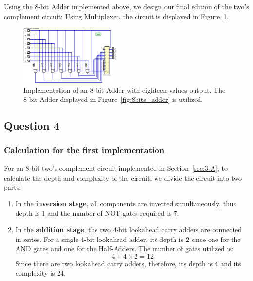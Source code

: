 \documentclass[conference]{IEEEtran}
\begin{document}
Using the 8-bit Adder implemented above, we design our final edition of the two's complement circuit: Using Multiplexer, the circuit is displayed in Figure~\ref{fig:twos_complement_course}.


\begin{figure}[h!]
\centering
\includegraphics[width=0.45\textwidth]{assets/twos_complement_course.png}
\caption{Implementation of an 8-bit Adder with eighteen values output. The 8-bit Adder displayed in Figure~\ref{fig:8bits_adder} is utilized.}
\label{fig:twos_complement_course}
\end{figure}


    
\subsection{Question 4}

\subsubsection{Calculation for the first implementation}\label{sec:q4}


For an 8-bit two's complement circuit implemented in Section~\ref{sec:3-A}, to calculate the depth and complexity of the circuit, we divide the circuit into two parts:
\begin{enumerate}
    \item In the \textbf{inversion stage}, all components are inverted simultaneously, thus depth is 1 and the number of NOT gates required is 7.
    \item In the \textbf{addition stage}, the two 4-bit lookahead carry adders are connected in series.
          For a single 4-bit lookahead adder, its depth is 2 since one for the AND gates and one for the Half-Adders. The number of gates utilized is:
          \begin{equation}
            4 + 4 \times 2 = 12
          \end{equation}
          Since there are two lookahead carry adders, therefore, its depth is 4 and its complexity is 24.

\end{enumerate}
\end{document}
